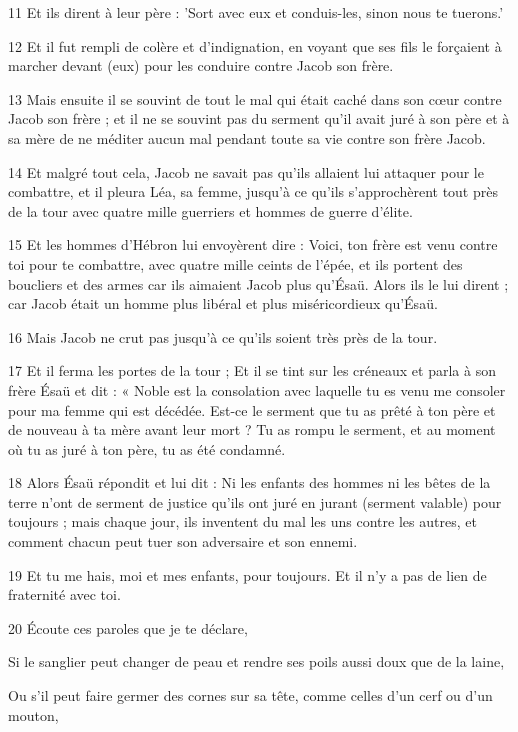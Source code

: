 \par 11 Et ils dirent à leur père : 'Sort avec eux et conduis-les, sinon nous te tuerons.'
\par 12 Et il fut rempli de colère et d'indignation, en voyant que ses fils le forçaient à marcher devant (eux) pour les conduire contre Jacob son frère.
\par 13 Mais ensuite il se souvint de tout le mal qui était caché dans son cœur contre Jacob son frère ; et il ne se souvint pas du serment qu'il avait juré à son père et à sa mère de ne méditer aucun mal pendant toute sa vie contre son frère Jacob.
\par 14 Et malgré tout cela, Jacob ne savait pas qu'ils allaient lui attaquer pour le combattre, et il pleura Léa, sa femme, jusqu'à ce qu'ils s'approchèrent tout près de la tour avec quatre mille guerriers et hommes de guerre d'élite.
\par 15 Et les hommes d'Hébron lui envoyèrent dire : Voici, ton frère est venu contre toi pour te combattre, avec quatre mille ceints de l'épée, et ils portent des boucliers et des armes car ils aimaient Jacob plus qu'Ésaü. Alors ils le lui dirent ; car Jacob était un homme plus libéral et plus miséricordieux qu'Ésaü.
\par 16 Mais Jacob ne crut pas jusqu'à ce qu'ils soient très près de la tour.
\par 17 Et il ferma les portes de la tour ; Et il se tint sur les créneaux et parla à son frère Ésaü et dit : « Noble est la consolation avec laquelle tu es venu me consoler pour ma femme qui est décédée. Est-ce le serment que tu as prêté à ton père et de nouveau à ta mère avant leur mort ? Tu as rompu le serment, et au moment où tu as juré à ton père, tu as été condamné.
\par 18 Alors Ésaü répondit et lui dit : Ni les enfants des hommes ni les bêtes de la terre n'ont de serment de justice qu'ils ont juré en jurant (serment valable) pour toujours ; mais chaque jour, ils inventent du mal les uns contre les autres, et comment chacun peut tuer son adversaire et son ennemi.
\par 19 Et tu me hais, moi et mes enfants, pour toujours. Et il n’y a pas de lien de fraternité avec toi.
\par 20 Écoute ces paroles que je te déclare,
\par    
\par     Si le sanglier peut changer de peau et rendre ses poils aussi doux que de la laine,  
\par     Ou s'il peut faire germer des cornes sur sa tête, comme celles d'un cerf ou d'un mouton,  
